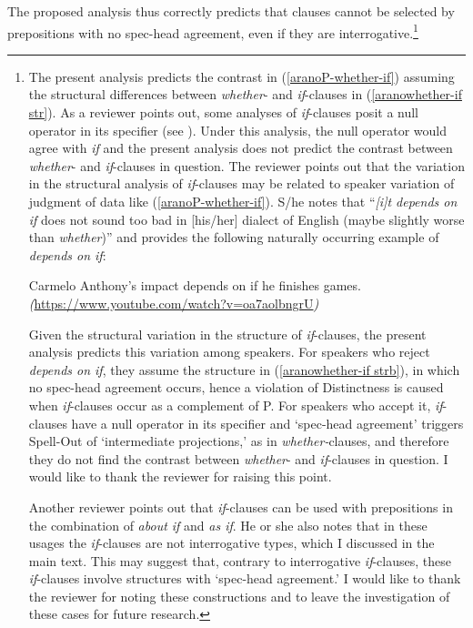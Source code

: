 \documentclass[output=paper]{langscibook}
\begin{document}
\noindent The proposed analysis thus correctly predicts that clauses cannot be selected by prepositions with no spec-head agreement, even if they are interrogative.\footnote{The present analysis predicts the contrast in (\ref{aranoP-whether-if}) assuming the structural differences between \emph{whether}- and \emph{if}-clauses in (\ref{aranowhether-if str}). As a reviewer points out, some analyses of \emph{if}-clauses posit a null operator in its specifier (see \citealt{Larson1985On-the-Syntax-o, Han2004The-Syntax-of-W, Wu2020Why-if-or-not-b}). Under this analysis, the null operator would agree with \emph{if} and the present analysis does not predict the contrast between \emph{whether}- and \emph{if}-clauses in question. The reviewer points out that the variation in the structural analysis of \emph{if}-clauses may be related to speaker variation of judgment of data like (\ref{aranoP-whether-if}). S/he notes that ``\emph{[i]t depends on if} does not sound too bad in [his/her] dialect of English (maybe slightly worse than \emph{whether})'' and provides the following naturally occurring example of \emph{depends on if}:


\renewcommand{\exfont}{\itshape} \settowidth\jamwidth{}
\ea 
Carmelo Anthony's impact depends on if he finishes games. \\
\emph{(}\url{https://www.youtube.com/watch?v=oa7aolbngrU}\emph{)}
\z

\noindent Given the structural variation in the structure of \emph{if}-clauses, the present analysis predicts this variation among speakers. For speakers who reject \emph{depends on if}, they assume the structure in (\ref{aranowhether-if strb}), in which no spec-head agreement occurs, hence a violation of Distinctness is caused when \emph{if}-clauses occur as a complement of P\@. For speakers who accept it, \emph{if}-clauses have a null operator in its specifier and `spec-head agreement' triggers Spell-Out of  `intermediate projections,' as in \emph{whether-}clauses, and therefore they do not find the contrast between \emph{whether}- and \emph{if}-clauses in question. I would like to thank the reviewer for raising this point.

Another reviewer points out that \emph{if}-clauses can be used with prepositions in the combination of \emph{about if} and \emph{as if}. He or she also notes that in these usages the \emph{if}-clauses are not interrogative types, which I discussed in the main text. This may suggest that, contrary to interrogative \emph{if}-clauses, these \emph{if}-clauses involve structures with `spec-head agreement.' I would like to thank the reviewer for noting these constructions and to leave the investigation of these cases for future research.} 
\end{document}
